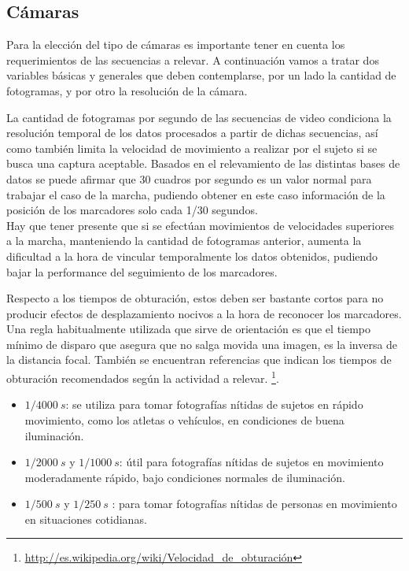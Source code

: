 \subsection{Cámaras}\label{parrafo_Camaras} 
Para la elección del tipo de cámaras es importante tener en cuenta los requerimientos de las secuencias a relevar. A continuación vamos a tratar dos variables básicas y generales que deben contemplarse, por un lado la cantidad de fotogramas, y por otro la resolución de la cámara.

La cantidad de fotogramas por segundo de las secuencias de video condiciona la resolución temporal de los datos procesados a partir de dichas secuencias, así como también limita la velocidad de movimiento a realizar por el sujeto si se busca una captura aceptable.
Basados en el relevamiento de las distintas bases de datos se puede afirmar que 30 cuadros por segundo es un valor normal para trabajar el caso de la marcha, pudiendo obtener en este caso información de la posición de los marcadores solo cada 1/30 segundos.\\ 
Hay que tener presente que si se efectúan movimientos de velocidades superiores a la marcha, manteniendo la cantidad de fotogramas anterior, aumenta la dificultad a la hora de vincular temporalmente los datos obtenidos, pudiendo bajar la performance del seguimiento de los marcadores. 

Respecto a los tiempos de obturación, estos deben ser bastante cortos  para no producir efectos de desplazamiento nocivos a la hora de reconocer los marcadores.
Una regla habitualmente utilizada que sirve de orientación es que el tiempo mínimo de disparo que asegura que no salga movida una imagen, es la inversa de la distancia focal. También se encuentran referencias que indican los tiempos de obturación recomendados según la actividad a relevar. \footnote{\textcolor{blue}{\underline{\url{http://es.wikipedia.org/wiki/Velocidad_de_obturación}}}}.
\begin{itemize}
\item $1 / 4000~ s$:  se utiliza para tomar fotografías nítidas de sujetos en rápido movimiento, como los atletas o vehículos, en condiciones de buena iluminación.
\item $1 / 2000 ~s$ y $1/ 1000~s$: útil  para fotografías nítidas de sujetos en movimiento moderadamente rápido, bajo condiciones normales de iluminación.
\item $1 / 500~s$ y $1/ 250~s$ :  para tomar fotografías nítidas de personas en movimiento en situaciones cotidianas.
\end{itemize}
 
